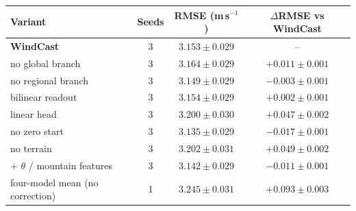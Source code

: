 \begin{tabular}{lccc}
\toprule
Variant & Seeds & RMSE (m\,s$^{-1}$) & $\Delta$RMSE vs WindCast \\
\midrule
\textbf{WindCast} & 3 & $3.153 \pm 0.029$ & -- \\
no global branch & 3 & $3.164 \pm 0.029$ & $+0.011 \pm 0.001$ \\
no regional branch & 3 & $3.149 \pm 0.029$ & $-0.003 \pm 0.001$ \\
bilinear readout & 3 & $3.154 \pm 0.029$ & $+0.002 \pm 0.001$ \\
linear head & 3 & $3.200 \pm 0.030$ & $+0.047 \pm 0.002$ \\
no zero start & 3 & $3.135 \pm 0.029$ & $-0.017 \pm 0.001$ \\
no terrain & 3 & $3.202 \pm 0.031$ & $+0.049 \pm 0.002$ \\
+ $\theta$ / mountain features & 3 & $3.142 \pm 0.029$ & $-0.011 \pm 0.001$ \\
four-model mean (no correction) & 1 & $3.245 \pm 0.031$ & $+0.093 \pm 0.003$ \\
\bottomrule
\end{tabular}
